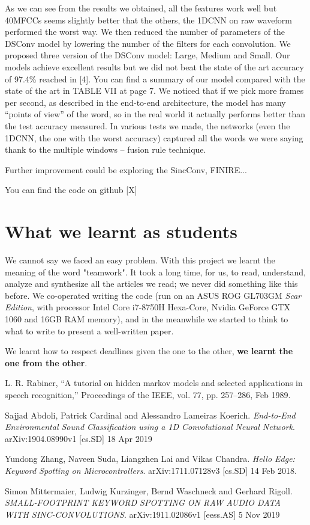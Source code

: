\documentclass[conference]{IEEEtran}
\begin{document}
As we can see from the results we obtained, all the features work well but 40MFCCs seems slightly better that the others, the 1DCNN on raw waveform performed the worst way.
We then reduced the number of parameters of the DSConv model by lowering the number of the filters for each convolution. We proposed three version of the DSConv model: Large, Medium and Small.
Our models achieve excellent results but we did not beat the state of the art accuracy of 97.4\% reached in [4]. You can find a summary of our model compared with the state of the art in TABLE VII at page 7.
We noticed that if we pick more frames per second, as described in the end-to-end architecture, the model has many “points of view” of the word, so in the real world it actually performs better than the test accuracy measured. In various tests we made, the networks (even the 1DCNN, the one with the worst accuracy) captured all the words we were saying thank to the multiple windows – fusion rule technique.

Further improvement could be exploring the SincConv, FINIRE...

You can find the code on github [X]

\section*{What we learnt as students}
We cannot say we faced an easy problem. With this project we learnt the meaning of the word "teamwork". It took a long time, for us, to read, understand, analyze and synthesize all the articles we read; we never did something like this before. We co-operated writing the code (run on an ASUS ROG GL703GM \textit{Scar Edition}, with processor Intel Core i7-8750H Hexa-Core, Nvidia  GeForce GTX 1060 and 16GB RAM memory), and in the meanwhile we started to think to what to write to present a well-written paper.

We learnt how to respect deadlines given the one to the other, \textbf{we learnt the one from the other}.

\begin{thebibliography}{1}
L. R. Rabiner, “A tutorial on hidden markov models and selected applications in speech recognition,” Proceedings of the IEEE, vol. 77, pp. 257–286, Feb 1989.

Sajjad Abdoli, Patrick Cardinal and Alessandro Lameiras Koerich. \textit{End-to-End Environmental Sound Classification using a 1D Convolutional Neural Network}. arXiv:1904.08990v1 [cs.SD] 18 Apr 2019

Yundong Zhang, Naveen Suda, Liangzhen Lai and Vikas Chandra. \textit{Hello Edge: Keyword Spotting on Microcontrollers}. arXiv:1711.07128v3 [cs.SD] 14 Feb 2018.

Simon Mittermaier, Ludwig Kurzinger, Bernd Waschneck and Gerhard Rigoll. \textit{SMALL-FOOTPRINT KEYWORD SPOTTING ON RAW AUDIO DATA WITH SINC-CONVOLUTIONS}. arXiv:1911.02086v1 [eess.AS] 5 Nov 2019

\end{thebibliography}
\end{document}
